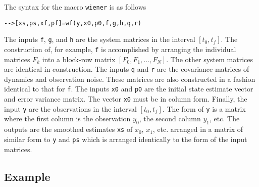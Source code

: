 	The syntax for the macro {\tt wiener} is as follows
\begin{verbatim}
-->[xs,ps,xf,pf]=wf(y,x0,p0,f,g,h,q,r)
\end{verbatim}
The inputs 
{\tt f}, {\tt g}, and {\tt h} are the system matrices in the interval 
$[t_0,t_f]$.  The construction of, for example, {\tt f} is accomplished
by arranging the individual matrices $F_k$ into a block-row matrix
$[F_0,F_1,\ldots,F_N]$.  The other system matrices are identical in
construction.  The inputs {\tt q} and {\tt r}
are the covariance matrices of dynamics and observation noise.  These
matrices are also constructed in a fashion identical to that for {\tt f}.
The inputs {\tt x0} and {\tt p0} are the initial state estimate vector
and error variance matrix.  The vector {\tt x0} must be in column form.
Finally, the input {\tt y} are the observations in the interval $[t_0,t_f]$.
The form of {\tt y} is a matrix where the first column is the observation
$y_0$, the second column $y_1$, etc.  The outputs are the smoothed
estimates {\tt xs} of $x_0$, $x_1$, etc. arranged in a matrix of similar form
to {\tt y} and {\tt ps} which is arranged identically to the form
of the input matrices.

\subsection{Example}

